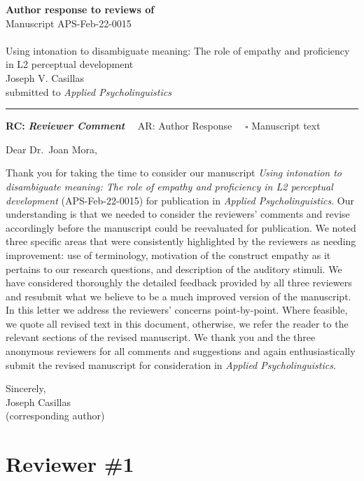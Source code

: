 \documentclass[]{article}
\begin{document}
{\Large\bf Author response to reviews of}\\[1em]
Manuscript APS-Feb-22-0015\\ \\
{\Large Using intonation to disambiguate meaning: The role of empathy and proficiency in L2 perceptual development}\\[1em]
{Joseph V. Casillas}\\
{submitted to \it Applied Psycholinguistics }\\
\hrule

\hfill {\bfseries RC:} \textbf{\textit{Reviewer Comment}}\(\quad\) AR: Author Response \(\quad\square\) Manuscript text

\vspace{2em}

Dear Dr.~Joan Mora,

Thank you for taking the time to consider our manuscript \emph{Using intonation to disambiguate meaning: The role of empathy and proficiency in L2 perceptual development
} (APS-Feb-22-0015) for publication in \emph{Applied Psycholinguistics}.
Our understanding is that we needed to consider the reviewers' comments and revise accordingly before the manuscript could be reevaluated for publication.
We noted three specific areas that were consistently highlighted by the reviewers as needing improvement: use of terminology, motivation of the construct empathy as it pertains to our research questions, and description of the auditory stimuli.
We have considered thoroughly the detailed feedback provided by all three reviewers and resubmit what we believe to be a much improved version of the manuscript.
In this letter we address the reviewers' concerns point-by-point.
Where feasible, we quote all revised text in this document, otherwise, we refer the reader to the relevant sections of the revised manuscript.
We thank you and the three anonymous reviewers for all comments and suggestions and again enthusiastically submit the revised manuscript for consideration in \emph{Applied Psycholinguistics}.

Sincerely,\\
Joseph Casillas\\
(corresponding author)

\clearpage

\hypertarget{reviewer-1}{%
\section{Reviewer \#1}\label{reviewer-1}}
\end{document}
